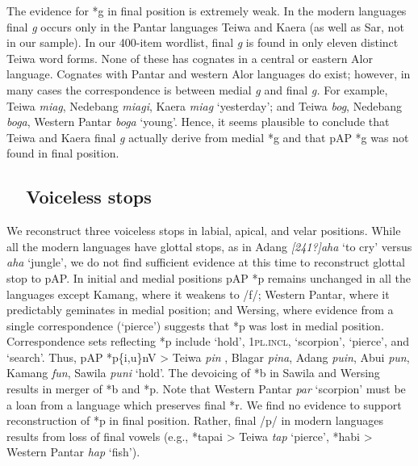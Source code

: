 The evidence for *g in final position is extremely weak. In the modern languages final \textit{g} occurs only in the Pantar languages Teiwa and Kaera (as well as Sar, not in our sample). In our 400-item wordlist, final \textit{g} is found in only eleven distinct Teiwa word forms. None of these has cognates in a central or eastern Alor language. Cognates with Pantar and western Alor languages do exist; however, in many cases the correspondence is between medial \textit{g }and final \textit{g.} For example, Teiwa \textit{mia{\textlengthmark}g}, Nedebang \textit{mia{\textlengthmark}gi}, Kaera \textit{miag} {\textquoteleft}yesterday{\textquoteright}; and Teiwa \textit{bog}, Nedebang \textit{boga}, Western Pantar \textit{bog{\textlengthmark}a} {\textquoteleft}young{\textquoteright}. Hence, it seems plausible to conclude that Teiwa and Kaera final \textit{g} actually derive from medial *g and that pAP *g was not found in final position. 

\subsection[\ \ Voiceless stops]{\ \ Voiceless stops}
\hypertarget{RefHeading49917871885726}{}We reconstruct three voiceless stops in labial, apical, and velar positions. While all the modern languages have glottal stops, as in Adang \textit{[241?]aha{\textltailn}} {\textquoteleft}to cry{\textquoteright} versus \textit{aha{\textltailn}} {\textquoteleft}jungle{\textquoteright}, we do not find sufficient evidence at this time to reconstruct glottal stop to pAP. In initial and medial positions pAP *p remains unchanged in all the languages except Kamang, where it weakens to /f/; Western Pantar, where it predictably geminates in medial position; and Wersing, where evidence from a single correspondence ({\textquoteleft}pierce{\textquoteright}) suggests that *p was lost in medial position. Correspondence sets reflecting *p include {\textquoteleft}hold{\textquoteright}, 1\textsc{pl.incl, {\textquoteleft}}scorpion{\textquoteright}, {\textquoteleft}pierce{\textquoteright}, and {\textquoteleft}search{\textquoteright}. Thus, pAP *p\{i,u\}nV {\textgreater} Teiwa \textit{pin}
, Blagar \textit{pina}, Adang \textit{puin}, Abui \textit{pun}, Kamang \textit{fun},\textit{ }Sawila \textit{puni }{\textquoteleft}hold{\textquoteright}. The devoicing of *b in Sawila and Wersing results in merger of *b and *p.  Note that Western Pantar \textit{par} {\textquoteleft}scorpion{\textquoteright} must be a loan from a language which preserves final *r. We find no evidence to support reconstruction of *p in final position. Rather, final /p/ in modern languages results from loss of final vowels (e.g., *tapai {\textgreater} Teiwa \textit{tap }{\textquoteleft}pierce{\textquoteright}, *habi {\textgreater} Western Pantar \textit{hap }{\textquoteleft}fish{\textquoteright}). 

